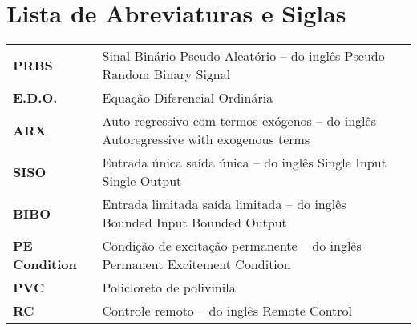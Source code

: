 
\chapter*{Lista de Abreviaturas e Siglas}

\begin{longtable}{lL{14cm}L{\textwidth}}

\textbf{PRBS}  & Sinal Binário Pseudo Aleatório -- do inglês Pseudo Random Binary Signal & \\

\textbf{E.D.O.}  & Equação Diferencial Ordinária & \\

\textbf{ARX}  & Auto regressivo com termos exógenos -- do inglês Autoregressive with exogenous terms & \\

\textbf{SISO}  & Entrada única saída única -- do inglês Single Input Single Output & \\

\textbf{BIBO}  & Entrada limitada saída limitada -- do inglês Bounded Input Bounded Output & \\

\textbf{PE Condition}  & Condição de excitação permanente -- do inglês Permanent Excitement Condition & \\

\textbf{PVC}  & Policloreto de polivinila& \\

\textbf{RC}  & Controle remoto -- do inglês Remote Control & \\

\end{longtable}
